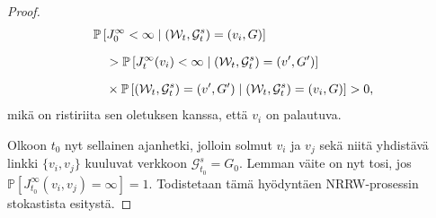 \documentclass[finnish, 12pt, a4paper, sci, utf8, pdfa]{aaltothesis}
\newcommand{\Grandom}{\mathcal{G}}
\newcommand{\Wrandom}{\mathcal{W}}
\newcommand*{\prob}{\mathbb{P}}
\begin{document}
\begin{proof}
\begin{equation*}
      \setlength{\jot}{10pt}
      \begin{aligned}
      & \prob \left[ J_{0}^{\infty} < \infty \mid (\Wrandom_{t}, \Grandom_{t}^{s}) = (v_{i}, G) \right] \\
      & \quad > \prob \left[ J_{t}^{\infty}(v_{i}) < \infty \mid (\Wrandom_{t}, \Grandom_{t}^{s}) = (v', G') \right] \\
      & \quad \times \prob \left[ (\Wrandom_{t}, \Grandom_{t}^{s}) = (v', G') \mid (\Wrandom_{t}, \Grandom_{t}^{s}) = (v_{i}, G) \right] > 0,
      \end{aligned}
   \end{equation*}
   mikä on ristiriita sen oletuksen kanssa, että $ v_{i} $ on palautuva.

   Olkoon $ t_{0} $ nyt sellainen ajanhetki, jolloin solmut $ v_{i} $ ja $ v_{j} $ sekä niitä yhdistävä linkki $ \{ v_{i}, v_{j} \} $ kuuluvat verkkoon $ \Grandom_{t_{0}}^{s} = G_{0} $.
   Lemman väite on nyt tosi, jos $ \prob \left[ J_{t_{0}}^{\infty}(v_{i}, v_{j}) = \infty \right] = 1. $ Todistetaan tämä hyödyntäen NRRW-prosessin stokastista esitystä.


\end{proof}
\end{document}
